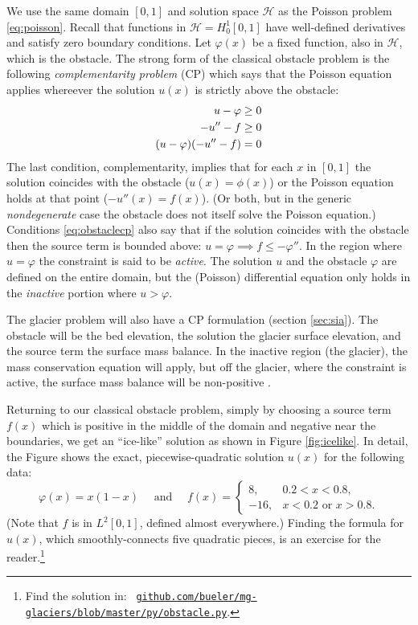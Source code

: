 \documentclass[letterpaper,final,12pt,reqno]{amsart}
\numberwithin{equation}{section}
\numberwithin{figure}{section}
\numberwithin{table}{section}
\begin{document}
We use the same domain $[0,1]$ and solution space $\mathcal{H}$ as the Poisson problem \eqref{eq:poisson}.  Recall that functions in $\mathcal{H}=H_0^1[0,1]$ have well-defined derivatives and satisfy zero boundary conditions.  Let $\varphi(x)$ be a fixed function, also in $\mathcal{H}$, which is the obstacle.  The strong form of the classical obstacle problem is the following \emph{complementarity problem} (CP) \cite{Bueler2021,KinderlehrerStampacchia1980} which says that the Poisson equation applies whereever the solution $u(x)$ is strictly above the obstacle:
\begin{align}
  u - \varphi &\ge 0 \label{eq:obstaclecp} \\
  -u''-f &\ge 0 \notag \\
  (u-\varphi)(-u''-f) &= 0 \notag
\end{align}
The last condition, complementarity, implies that for each $x$ in $[0,1]$ the solution coincides with the obstacle ($u(x)=\phi(x)$) or the Poisson equation holds at that point ($-u''(x)=f(x)$).  (Or both, but in the generic \emph{nondegenerate} \cite{KinderlehrerStampacchia1980} case the obstacle does not itself solve the Poisson equation.)  Conditions \eqref{eq:obstaclecp} also say that if the solution coincides with the obstacle then the source term is bounded above: $u=\varphi \implies f \le -\varphi''$.  In the region where $u=\varphi$ the constraint is said to be \emph{active}.  The solution $u$ and the obstacle $\varphi$ are defined on the entire domain, but the (Poisson) differential equation only holds in the \emph{inactive} portion where $u>\varphi$.

The glacier problem will also have a CP formulation (section \ref{sec:sia}).  The obstacle will be the bed elevation, the solution the glacier surface elevation, and the source term the surface mass balance.  In the inactive region (the glacier), the mass conservation equation will apply, but off the glacier, where the constraint is active, the surface mass balance will be non-positive \cite{Bueler2016}.

Returning to our classical obstacle problem, simply by choosing a source term $f(x)$ which is positive in the middle of the domain and negative near the boundaries, we get an ``ice-like'' solution as shown in Figure \ref{fig:icelike}.  In detail, the Figure shows the exact, piecewise-quadratic solution $u(x)$ for the following data:
\begin{equation}
\varphi(x) = x(1-x) \quad \text{ and } \quad f(x) = \begin{cases} 8, & 0.2 < x < 0.8, \\
                                                               -16, & x<0.2 \text{ or } x>0.8. \end{cases}  \label{eq:icelikedetails}
\end{equation}
(Note that $f$ is in $L^2[0,1]$, defined almost everywhere.)  Finding the formula for $u(x)$, which smoothly-connects five quadratic pieces, is an exercise for the reader.\footnote{Find the solution in: \, \href{https://github.com/bueler/mg-glaciers/blob/master/py/obstacle.py}{\texttt{github.com/bueler/mg-glaciers/blob/master/py/obstacle.py}}.}
\end{document}
